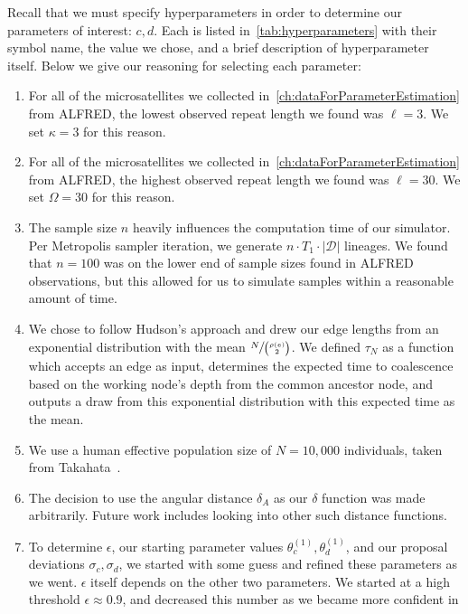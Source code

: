 Recall that we must specify hyperparameters in order to determine our parameters of interest: $c, d$.
Each is listed in~\autoref{tab:hyperparameters} with their symbol name, the value we chose, and a brief description of 
hyperparameter itself.
Below we give our reasoning for selecting each parameter:
\begin{enumerate}
    \item For all of the microsatellites we collected in~\autoref{ch:dataForParameterEstimation} from ALFRED, the
        lowest observed repeat length we found was $\ell=3$.
        We set $\kappa = 3$ for this reason.
    \item For all of the microsatellites we collected in~\autoref{ch:dataForParameterEstimation} from ALFRED, the
        highest observed repeat length we found was $\ell=30$.
        We set $\Omega = 30$ for this reason.
    \item The sample size $n$ heavily influences the computation time of our simulator.
        Per Metropolis sampler iteration, we generate $n \cdot T_1 \cdot | \mathcal{D} |$ lineages.
        We found that $n=100$ was on the lower end of sample sizes found in ALFRED observations, but this allowed for us
        to simulate samples within a reasonable amount of time.
    \item We chose to follow Hudson's approach and drew our edge lengths from an exponential distribution with the mean
        $\sfrac{N}{\binom{\rho(e)}{2}}$.
        We defined $\tau_N$ as a function which accepts an edge as input, determines the expected time to coalescence
        based on the working node's depth from the common ancestor node, and outputs a draw from this exponential
        distribution with this expected time as the mean.
    \item We use a human effective population size of $N=10,000$ individuals, taken from
        Takahata~\cite{takahataAllelicGenealogyHuman1993}.
    \item The decision to use the angular distance $\delta_A$ as our $\delta$ function was made arbitrarily.
        Future work includes looking into other such distance functions.
    \item To determine $\epsilon$, our starting parameter values $\theta^{(1)}_c, \theta^{(1)}_d$, and our proposal
        deviations $\sigma_c, \sigma_d$, we started with some guess and refined these parameters as we went.
        $\epsilon$ itself depends on the other two parameters.
        We started at a high threshold $\epsilon \approx 0.9$, and decreased this number as we became more confident in

\end{enumerate}

